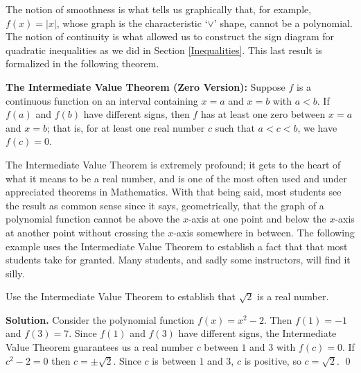 The notion of smoothness is what tells us graphically that, for example, $f(x) = |x|$, whose graph is the characteristic `$\vee$' shape, cannot be a polynomial.  The notion of continuity is what allowed us to construct the sign diagram for quadratic inequalities as we did in Section \ref{Inequalities}.  This last result is formalized in the following theorem.
  
\smallskip

\colorbox{ResultColor}{\bbm

\begin{thm} \textbf{The Intermediate Value Theorem (Zero Version):}  Suppose $f$ is a continuous function on an interval containing $x=a$ and $x=b$ with $a<b$. If $f(a)$ and $f(b)$ have different signs, then $f$ has at least one zero between $x = a$ and $x = b$;  that is, for at least one real number $c$ such that $a < c < b$, we have $f(c) = 0$. 


\label{IVT}
\end{thm}

\ebm}

\smallskip

The Intermediate Value Theorem is extremely profound;  it gets to the heart of what it means to be a real number, and is one of the most often used and under appreciated theorems in Mathematics.  With that being said, most students see the result as common sense since it says, geometrically, that the graph of a polynomial function cannot be above the $x$-axis at one point and below the $x$-axis at another point without crossing the $x$-axis somewhere in between.  The following example uses the Intermediate Value Theorem to establish a fact that that most students take for granted.  Many students, and sadly some instructors, will find it silly.

\begin{ex}  Use the Intermediate Value Theorem to establish that $\sqrt{2}$ is a real number.

\smallskip

{\bf Solution.}  Consider the polynomial function $f(x) = x^2 - 2$.  Then $f(1) = -1$ and $f(3) = 7$.  Since $f(1)$ and $f(3)$ have different signs, the Intermediate Value Theorem guarantees us a real number $c$ between $1$ and $3$ with $f(c) = 0$.  If $c^2 - 2 = 0$ then $c = \pm \sqrt{2}$.  Since $c$ is between $1$ and $3$, $c$ is positive, so $c = \sqrt{2}$. \qed

\end{ex}

